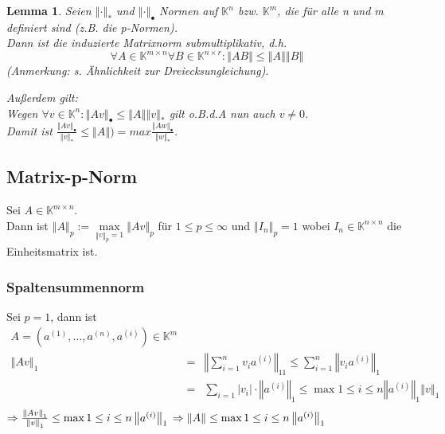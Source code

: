 \documentclass[a4paper,10pt]{article}
\newcommand{\norm}[1]{ \left\Vert #1 \right\Vert }
\newtheorem[L]{satz}{Satz}[section]
\newtheorem{lemma}{Lemma}[section]
\newtheorem[S]{beweis}{Beweis}
\newtheorem[S]{beh}{Behauptung}
\begin{document}
\bigskip

\begin{lemma}
Seien $\norm{\cdot}_*$ und $\norm{\cdot}_\bullet$ Normen auf $\mathbb{K}^n$ bzw. $\mathbb{K}^m$, die für alle n und m definiert sind (z.B. die p-Normen).\\
Dann ist die induzierte Matrixnorm submultiplikativ, d.h. 
$$\forall A \in \mathbb{K}^{m \times n} \forall B \in \mathbb{K}^{n \times r} :
\norm{AB} \leq \norm{A} \norm{B}$$
(Anmerkung: s. Ähnlichkeit zur Dreiecksungleichung).

\bigskip

Außerdem gilt:\\
Wegen $\forall v \in \mathbb{K}^n: \norm{Av}_\bullet \leq \norm{A} \norm{v}_*$ gilt o.B.d.A nun auch $ v \neq 0 $.\\
Damit ist $\frac{\norm{Av}_\bullet}{\norm{v}_*} \leq \norm{A}) = max \frac{\norm{Aw}_\bullet }{\norm{w}_*}$.

\end{lemma}

\newpage

\subsection{Matrix-p-Norm}
Sei $A \in \mathbb{K}^{m \times n}$.\\
Dann ist $\norm{A}_p := \max\limits_{\norm{v}_p = 1} \norm{Av}_p$ für $ 1 \leq p \leq \infty$ und $\norm{I_n}_p = 1$ wobei $I_n \in \mathbb{K}^{n \times n}$ die Einheitsmatrix ist.\\

\subsubsection{Spaltensummennorm}
  Sei $p = 1$, dann ist 
  \begin{eqnarray*}
  A = (a^{(1)}, \ldots, a^{(n)}, a^{(i)}) \in \mathbb{K}^m \\
  \norm{Av}_1 &=& \norm{\sum\limits_{i = 1}^n {v_i a^{(i)}}}_11 \leq \sum\limits_{i = 1}^n \norm{v_i a^{(i)}}_1\\
    &=& \sum\limits_{i = 1} |v_i| \cdot \norm{a^{(i)}}_1 \leq \max\limits{1 \leq i\leq n} \norm{a^{(i)}}_1 \norm{v}_1\\
  \end{eqnarray*}
  $\Rightarrow \frac{\norm{Av}_1}{\norm{v}_1} \leq \max\limits{1 \leq i\leq n} \norm{a^{(i)}}_1\\
  \Rightarrow \norm{A} \leq \max\limits{1 \leq i\leq n} \norm{a^{(i)}}_1$
\end{document}
